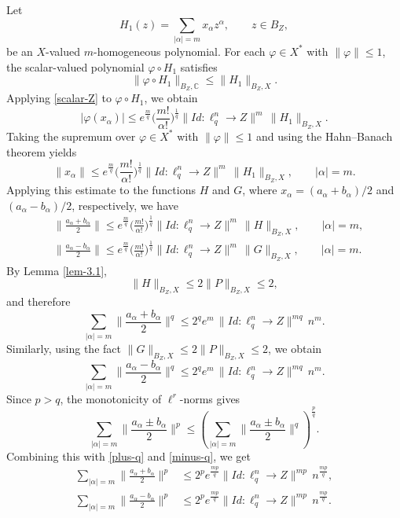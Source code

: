 \documentclass[a4paper,11pt, reqno]{amsart}
\theoremstyle{definition}
\begin{document}
	Let
	\[
	H_1(z)=\sum_{|\alpha|=m} x_\alpha z^\alpha,
	\qquad z\in B_Z,
	\]
	be an $X$-valued $m$-homogeneous polynomial.
	For each $\varphi\in X^*$ with $\|\varphi\|\le 1$, the scalar-valued polynomial
	$\varphi\circ H_1$ satisfies
	\[
	\|\varphi\circ H_1\|_{B_Z,\mathbb{C}}\le \|H_1\|_{B_Z,X}.
	\]
	Applying \eqref{scalar-Z} to $\varphi\circ H_1$, we obtain
	\[
	|\varphi(x_\alpha)|
	\le e^{\frac mq}\Big(\frac{m!}{\alpha!}\Big)^{\frac1q}
	\|Id:\ell_q^n\to Z\|^m\,\|H_1\|_{B_Z,X}.
	\]
	Taking the supremum over $\varphi\in X^*$ with $\|\varphi\|\le 1$
	and using the Hahn--Banach theorem yields
	\begin{equation}\label{HB}
		\|x_\alpha\|
		\le e^{\frac mq}\Big(\frac{m!}{\alpha!}\Big)^{\frac1q}
		\|Id:\ell_q^n\to Z\|^m\,\|H_1\|_{B_Z,X},
		\qquad |\alpha|=m.
	\end{equation}
Applying this estimate to the functions $H$ and $G$, where $x_\alpha=(a_\alpha+b_\alpha)/2$ and $(a_\alpha-b_\alpha)/2$, respectively, we have
 \begin{align*}\label{HB-1}
 &	\Big\|\frac{a_\alpha+b_\alpha}{2}\Big\|
 	\le e^{\frac mq}\Big(\frac{m!}{\alpha!}\Big)^{\frac1q}
 	\|Id:\ell_q^n\to Z\|^m\,\|H\|_{B_Z,X},
 	\qquad |\alpha|=m,\\
 & \Big\|\frac{a_\alpha-b_\alpha}{2}\Big\|
 \le e^{\frac mq}\Big(\frac{m!}{\alpha!}\Big)^{\frac1q}
 \|Id:\ell_q^n\to Z\|^m\,\|G\|_{B_Z,X},
 \qquad |\alpha|=m.
 \end{align*}	
	By Lemma \ref{lem-3.1},
	\[
	\|H\|_{B_Z,X}\le 2\|P\|_{B_Z,X}\le 2,
	\]
	and therefore
	\begin{equation}\label{plus-q}
		\sum_{|\alpha|=m}\Big\|\frac{a_\alpha+b_\alpha}{2}\Big\|^q
		\le 2^q e^{m}\,\|Id:\ell_q^n\to Z\|^{mq} \, n^m.
	\end{equation}
Similarly, using the fact $\|G\|_{B_Z,X}\le 2\|P\|_{B_Z,X}\le 2$, we obtain
	\begin{equation}\label{minus-q}
		\sum_{|\alpha|=m}\Big\|\frac{a_\alpha-b_\alpha}{2}\Big\|^q
		\le 2^q e^{m}\,\|Id:\ell_q^n\to Z\|^{mq} \, n^m.
	\end{equation}
	Since $p>q$, the monotonicity of $\ell^r$-norms gives
	\[
	\sum_{|\alpha|=m}\Big\|\frac{a_\alpha\pm b_\alpha}{2}\Big\|^p
	\le \left(\sum_{|\alpha|=m}\Big\|\frac{a_\alpha\pm b_\alpha}{2}\Big\|^q\right)^{\frac pq}.
	\]
	Combining this with \eqref{plus-q} and \eqref{minus-q}, we get
	\begin{align*}
		\sum_{|\alpha|=m}\Big\|\frac{a_\alpha+b_\alpha}{2}\Big\|^p
		&\le 2^p e^{\frac{mp}{q}}\|Id:\ell_q^n\to Z\|^{mp}\, n^{\frac{mp}{q}}, \\
		\sum_{|\alpha|=m}\Big\|\frac{a_\alpha-b_\alpha}{2}\Big\|^p
		&\le 2^p e^{\frac{mp}{q}}\|Id:\ell_q^n\to Z\|^{mp}\, n^{\frac{mp}{q}}.
	\end{align*}
\end{document}
